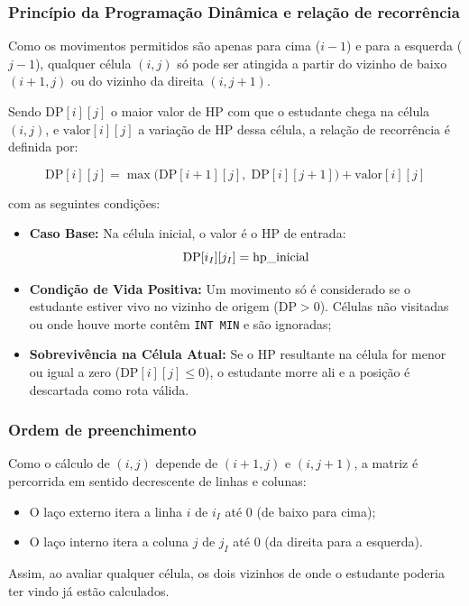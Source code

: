 \documentclass[12pt,a4paper]{article}
\makeatletter
\DeclareRobustCommand{\_}{%
  \ifmmode
    \nfss@text{\textunderscore}%
  \else
    \textunderscore\allowbreak
  \fi
}
\makeatother
\begin{document}
\subsubsection*{Princípio da Programação Dinâmica e relação de recorrência}

Como os movimentos permitidos são apenas para cima ($i-1$) e para a esquerda ($j-1$), qualquer célula $(i,j)$ só pode ser atingida a partir do vizinho de baixo $(i+1,j)$ ou do vizinho da direita $(i,j+1)$.

Sendo $\text{DP}[i][j]$ o maior valor de HP com que o estudante chega na célula $(i,j)$, e $\text{valor}[i][j]$ a variação de HP dessa célula, a relação de recorrência é definida por:

\begin{equation}
\text{DP}[i][j] = \max\Big(\text{DP}[i+1][j],\; \text{DP}[i][j+1]\Big) + \text{valor}[i][j]
\label{eq:recorrencia_dp}
\end{equation}

com as seguintes condições:
\begin{itemize}
    \item \textbf{Caso Base:} Na célula inicial, o valor é o HP de entrada:
    $$\text{DP}[i_I][j_I] = \text{hp\_inicial}$$
    \item \textbf{Condição de Vida Positiva:} Um movimento só é considerado se o estudante estiver vivo no vizinho de origem ($\text{DP} > 0$). Células não visitadas ou onde houve morte contêm \texttt{INT\_MIN} e são ignoradas;
    \item \textbf{Sobrevivência na Célula Atual:} Se o HP resultante na célula for menor ou igual a zero ($\text{DP}[i][j] \le 0$), o estudante morre ali e a posição é descartada como rota válida.
\end{itemize}

\subsubsection*{Ordem de preenchimento}

Como o cálculo de $(i,j)$ depende de $(i+1,j)$ e $(i,j+1)$, a matriz é percorrida em sentido decrescente de linhas e colunas:
\begin{itemize}
    \item O laço externo itera a linha $i$ de $i_I$ até 0 (de baixo para cima);
    \item O laço interno itera a coluna $j$ de $j_I$ até 0 (da direita para a esquerda).
\end{itemize}
Assim, ao avaliar qualquer célula, os dois vizinhos de onde o estudante poderia ter vindo já estão calculados.
\end{document}
